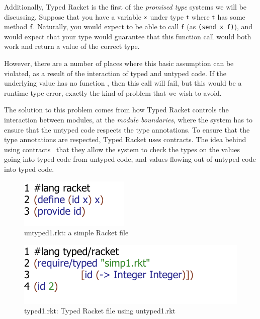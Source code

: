 \documentclass[a4paper,USenglish]{tex/lipics-v2016}
\begin{document}
Additionally, Typed Racket is the first of the \emph{promised type} systems
we will be discussing. Suppose that you have a variable ${\sf{x}}$ under type ${\sf{t}}$
where ${\sf{t}}$ has some method ${\sf{f}}$. Naturally, you would expect to be able
to call ${\sf{f}}$ (as \verb|(send x f)|), and would expect that your type
would guarantee that this function call would both work and return a value
of the correct type.

However, there are a number of places where this basic assumption can be
violated, as a result of the interaction of typed and untyped code. If the
underlying value has no function , then this call will fail, but this
would be a runtime type error, exactly the kind of problem that we wish to
avoid.

The solution to this problem comes from how Typed Racket controls the
interaction between modules, at the \emph{module boundaries}, where the
system has to ensure that the untyped code respects the type annotations. To
ensure that the type annotations are respected, Typed Racket uses
contracts. The idea behind using contracts~\cite{ff-icfp02} that they allow
the system to check the types on the values going into typed code from
untyped code, and values flowing out of untyped code into typed code.

\begin{figure}[h]
\includegraphics{figures/untyped-rkt1.pdf}
\caption{untyped1.rkt: a simple Racket file}
\label{fig:ut1r}
\end{figure}

\begin{figure}
\includegraphics{figures/typed-rkt1.pdf}
\caption{typed1.rkt: Typed Racket file using untyped1.rkt}
\label{fig:t1r}
\end{figure}
\end{document}
